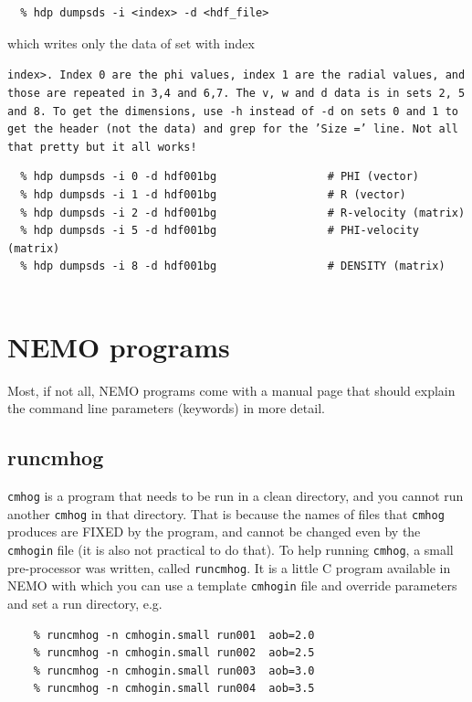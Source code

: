 \documentclass[10pt,dvips]{article}
\begin{document}
\begin{verbatim}
  % hdp dumpsds -i <index> -d <hdf_file>
\end{verbatim}
which writes only the data of set with index 
{\tt index>.  Index 0 are the phi
values, index 1 are the radial values, and those are repeated in 3,4 and
6,7.  The v, w and d data is in sets 2, 5 and 8.  To get the dimensions,
use -h instead of -d on sets 0 and 1 to get the header (not the data) and
grep for the 'Size =' line.  Not all that pretty but it all works!
\begin{verbatim}
  % hdp dumpsds -i 0 -d hdf001bg                 # PHI (vector)
  % hdp dumpsds -i 1 -d hdf001bg                 # R (vector)
  % hdp dumpsds -i 2 -d hdf001bg                 # R-velocity (matrix)
  % hdp dumpsds -i 5 -d hdf001bg                 # PHI-velocity (matrix)
  % hdp dumpsds -i 8 -d hdf001bg                 # DENSITY (matrix)
  
\end{verbatim}

\section{NEMO programs}

Most, if not all, NEMO programs come with a manual page that should
explain the command line parameters (keywords) in more detail.

\subsection{runcmhog}

{\tt cmhog} is a program that needs to be run in a clean directory, and you
cannot run another {\tt cmhog} in that directory. That is because the names
of files that {\tt cmhog} produces are FIXED by the program, and cannot be
changed even by the {\tt cmhogin} file (it is also not practical to do that).
To help running {\tt cmhog}, a small pre-processor was written, called
{\tt runcmhog}. It is a little C program available in NEMO with which you
can use a template {\tt cmhogin} file and override parameters and set
a run directory, e.g.

\begin{verbatim}
    % runcmhog -n cmhogin.small run001  aob=2.0
    % runcmhog -n cmhogin.small run002  aob=2.5
    % runcmhog -n cmhogin.small run003  aob=3.0
    % runcmhog -n cmhogin.small run004  aob=3.5
\end{verbatim}

}
\end{document}
